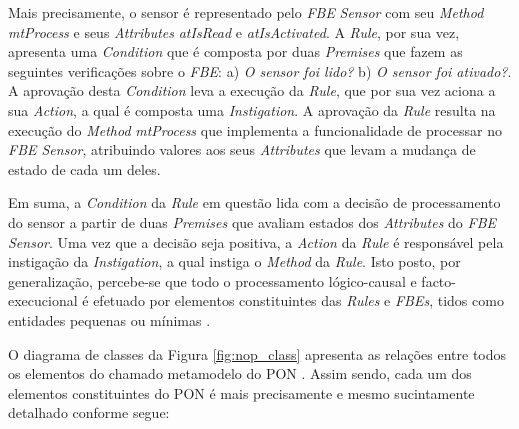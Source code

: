 Mais precisamente, o sensor é representado pelo \textit{FBE} \textit{Sensor} com
seu \textit{Method} \textit{mtProcess} e seus \textit{Attributes}
\textit{atIsRead} e \textit{atIsActivated}. A \textit{Rule}, por sua vez,
apresenta uma \textit{Condition} que é composta por duas \textit{Premises} que
fazem as seguintes verificações sobre o \textit{FBE}: a) \textit{O sensor foi
  lido?} b) \textit{O sensor foi ativado?}. A aprovação desta \textit{Condition}
leva a execução da \textit{Rule}, que por sua vez aciona a sua \textit{Action},
a qual é composta uma \textit{Instigation}. A aprovação da \textit{Rule} resulta
na execução do \textit{Method} \textit{mtProcess} que implementa a
funcionalidade de processar no \textit{FBE Sensor}, atribuindo valores aos seus
\textit{Attributes} que levam a mudança de estado de cada um deles.

Em suma, a \textit{Condition} da \textit{Rule} em questão lida com a decisão de
processamento do sensor a partir de duas \textit{Premises} que avaliam estados
dos \textit{Attributes} do \textit{FBE Sensor}. Uma vez que a decisão seja
positiva, a \textit{Action} da \textit{Rule} é responsável pela instigação da
\textit{Instigation}, a qual instiga o \textit{Method} da \textit{Rule}. Isto
posto, por generalização, percebe-se que todo o processamento lógico-causal e
facto-execucional é efetuado por elementos constituintes das \textit{Rules} e
\textit{FBEs}, tidos como entidades pequenas ou mínimas
\cite{pat_simao_2008,simao_2009,doc_Kerschbaumer_2018}.

O diagrama de classes da Figura \ref{fig:nop_class} apresenta as relações entre
todos os elementos do chamado metamodelo do PON
\cite{simao_2009,msc_Ronszcka_2012,simao_2012a}. Assim sendo, cada um dos
elementos constituintes do PON é mais precisamente e mesmo sucintamente
detalhado conforme segue:

